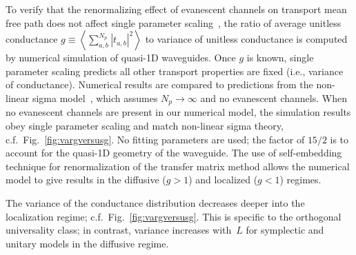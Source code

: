 To verify that the renormalizing effect of evanescent channels on transport mean free path does not affect single parameter scaling~\cite{1979_Anderson}, the ratio of average unitless conductance $ g \equiv \left\langle\sum_{a,b}^{N_p} |t_{a,b}|^2\right\rangle$ to variance of unitless conductance is computed by numerical simulation of quasi-1D waveguides. Once $g$ is known, single parameter scaling predicts all other transport properties are fixed (i.e., variance of conductance). Numerical results are compared to predictions from the non-linear sigma model~\cite{2000_Mirlin}, which assumes $N_p \rightarrow \infty$ and no evanescent channels. When no evanescent channels are present in our numerical model, the simulation results obey single parameter scaling and match non-linear sigma theory, c.f.~Fig.~\ref{fig:vargversusg}. No fitting parameters are used; the factor of $15/2$ is to account for the quasi-1D geometry of the waveguide. The use of self-embedding technique for renormalization of the transfer matrix method allows the numerical model to give results in the diffusive ($g>1$) and localized ($g<1$) regimes.

The variance of the conductance distribution decreases deeper into the localization regime; c.f.~Fig.~\ref{fig:vargversusg}. This is specific to the orthogonal universality class; in contrast, variance increases with~$L$ for symplectic and unitary models in the diffusive regime.


